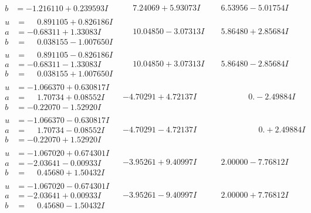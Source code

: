 \documentclass[1p]{elsarticle_modified}
\theoremstyle{definition}
\begin{document}
$$\begin{array}{c|c|c}
\begin{aligned}
b &= -1.216110 + 0.239593 I\end{aligned}
 & \phantom{-}7.24069 + 5.93073 I & \phantom{-}6.53956 - 5.01754 I \\ \hline\begin{aligned}
u &= \phantom{-}0.891105 + 0.826186 I \\
a &= -0.68311 + 1.33083 I \\
b &= \phantom{-}0.038155 - 1.007650 I\end{aligned}
 & \phantom{-}10.04850 - 3.07313 I & \phantom{-}5.86480 + 2.85684 I \\ \hline\begin{aligned}
u &= \phantom{-}0.891105 - 0.826186 I \\
a &= -0.68311 - 1.33083 I \\
b &= \phantom{-}0.038155 + 1.007650 I\end{aligned}
 & \phantom{-}10.04850 + 3.07313 I & \phantom{-}5.86480 - 2.85684 I \\ \hline\begin{aligned}
u &= -1.066370 + 0.630817 I \\
a &= \phantom{-}1.70734 + 0.08552 I \\
b &= -0.22070 - 1.52920 I\end{aligned}
 & -4.70291 + 4.72137 I & \phantom{-0.000000 } 0. - 2.49884 I \\ \hline\begin{aligned}
u &= -1.066370 - 0.630817 I \\
a &= \phantom{-}1.70734 - 0.08552 I \\
b &= -0.22070 + 1.52920 I\end{aligned}
 & -4.70291 - 4.72137 I & \phantom{-0.000000 -}0. + 2.49884 I \\ \hline\begin{aligned}
u &= -1.067020 + 0.674301 I \\
a &= -2.03641 - 0.00933 I \\
b &= \phantom{-}0.45680 + 1.50432 I\end{aligned}
 & -3.95261 + 9.40997 I & \phantom{-}2.00000 - 7.76812 I \\ \hline\begin{aligned}
u &= -1.067020 - 0.674301 I \\
a &= -2.03641 + 0.00933 I \\
b &= \phantom{-}0.45680 - 1.50432 I\end{aligned}
 & -3.95261 - 9.40997 I & \phantom{-}2.00000 + 7.76812 I \\ \hline\begin{aligned}

\end{aligned}
\end{array}$$
\end{document}
